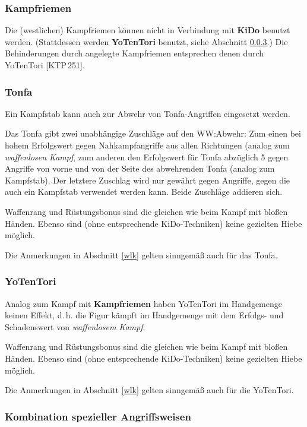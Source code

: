 \documentclass[10pt,a4paper,germanpar]{article}
\begin{document}
\subsubsection{Kampfriemen}

Die (westlichen) Kampfriemen können nicht in Verbindung mit
\textbf{KiDo} benutzt werden. (Stattdessen werden \textbf{YoTenTori}
benutzt, siehe Abschnitt \ref{yotentori}.) Die Behinderungen durch
angelegte Kampfriemen entsprechen denen durch YoTenTori [KTP\,251].

\subsubsection{Tonfa}

Ein Kampfstab kann auch zur Abwehr von Tonfa-Angriffen eingesetzt
werden.

Das Tonfa gibt zwei unabhängige Zuschläge auf den WW:Abwehr: Zum einen
bei hohem Erfolgswert gegen Nahkampfangriffe aus allen Richtungen
(analog zum \emph{waffenlosen Kampf}, zum anderen den Erfolgswert für
Tonfa abzüglich 5 gegen Angriffe von vorne und von der Seite des
abwehrenden Tonfa (analog zum Kampfstab). Der letztere Zuschlag wird
nur gewährt gegen Angriffe, gegen die auch ein Kampfstab verwendet
werden kann. Beide Zuschläge addieren sich.

Waffenrang und Rüstungsbonus sind die gleichen wie beim Kampf mit
bloßen Händen. Ebenso sind (ohne entsprechende KiDo-Techniken) keine
gezielten Hiebe möglich.

Die Anmerkungen in Abschnitt \ref{wlk} gelten sinngemäß auch für das
Tonfa.

\subsubsection{YoTenTori}
\label{yotentori}

Analog zum Kampf mit \textbf{Kampfriemen} haben YoTenTori im
Handgemenge keinen Effekt, d.\,h. die Figur kämpft im Handgemenge mit
dem Erfolgs- und Schadenswert von \emph{waffenlosem Kampf}.

Waffenrang und Rüstungsbonus sind die gleichen wie beim Kampf mit
bloßen Händen. Ebenso sind (ohne entsprechende KiDo-Techniken) keine
gezielten Hiebe möglich.

Die Anmerkungen in Abschnitt \ref{wlk} gelten sinngemäß auch für die
YoTenTori.

\subsubsection{Kombination spezieller Angriffsweisen}
\label{kombi}
\end{document}
